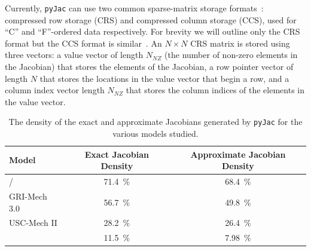 \documentclass[12pt,number,sort&compress,preprint]{elsarticle}
\begin{document}
Currently, \texttt{pyJac} can use two common sparse-matrix storage formats~\cite{netlib_templates}: compressed row storage (CRS) and compressed column storage (CCS), used for ``C'' and ``F''-ordered data respectively.
For brevity we will outline only the CRS format but the CCS format is similar~\cite{netlib_templates}.
An $N\times N$ CRS matrix is stored using three vectors: a value vector of length $N_{NZ}$ (the number of non-zero elements in the Jacobian) that stores the elements of the Jacobian, a row pointer vector of length $N$ that stores the locations in the value vector that begin a row, and a column index vector length $N_{NZ}$ that stores the column indices of the elements in the value vector.

\begin{table}[tbp]
\centering
\begin{tabular}{@{}l S[table-format=2.1] S[table-format=2.1]@{}}
\toprule
Model                 & {Exact Jacobian Density} & {Approximate Jacobian Density} \\
\midrule
{}\slash {} & \SI{71.4}{\percent} & \SI{68.4}{\percent} \\
GRI-Mech 3.0          & \SI{56.7}{\percent} & \SI{49.8}{\percent} \\
USC-Mech II           & \SI{28.2}{\percent} & \SI{26.4}{\percent} \\
         & \SI{11.5}{\percent} & \SI{7.98}{\percent} \\
\bottomrule
\end{tabular}
\caption{The density of the exact and approximate Jacobians generated by \texttt{pyJac} for the various models studied.}
\label{T:jac_sparsity}
\end{table}
\end{document}
